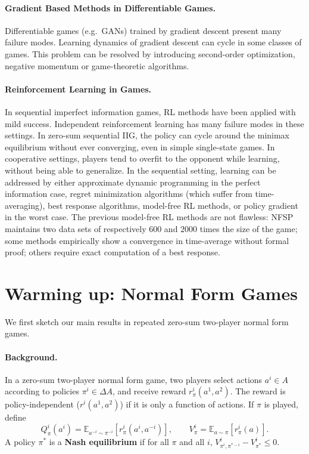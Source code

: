 \paragraph{Gradient Based Methods in Differentiable Games.}
Differentiable games (e.g.\ GANs) trained by gradient descent present many failure modes. Learning dynamics of gradient descent can cycle in some classes of games. This problem can be resolved by introducing second-order optimization, negative momentum or game-theoretic algorithms.

\paragraph{Reinforcement Learning in Games.}
In sequential imperfect information games, RL methods have been applied with mild success. Independent reinforcement learning has many failure modes in these settings. In zero-sum sequential IIG, the policy can cycle around the minimax equilibrium without ever converging, even in simple single-state games. In cooperative settings, players tend to overfit to the opponent while learning, without being able to generalize. In the sequential setting, learning can be addressed by either approximate dynamic programming in the perfect information case, regret minimization algorithms (which suffer from time-averaging), best response algorithms, model-free RL methods, or policy gradient in the worst case. The previous model-free RL methods are not flawless: NFSP maintains two data sets of respectively $600$ and $2000$ times the size of the game; some methods empirically show a convergence in time-average without formal proof; others require exact computation of a best response.

\section{Warming up: Normal Form Games}
We first sketch our main results in repeated zero-sum two-player normal form games.

\paragraph{Background.}
In a zero-sum two-player normal form game, two players select actions $a^i \in A$ according to policies $\pi^i \in \Delta A$, and receive reward $r_\pi^i(a^1, a^2)$. The reward is policy-independent ($r^i(a^1, a^2)$) if it is only a function of actions. If $\pi$ is played, define
$$Q^i_\pi(a^i) = \mathbb{E}_{a^{-i} \sim \pi^{-i}}[r_\pi^i(a^i, a^{-i})],\qquad V^i_\pi = \mathbb{E}_{a \sim \pi}[r_\pi^i(a)].$$
A policy $\pi^*$ is a \textbf{Nash equilibrium} if for all $\pi$ and all $i$, $V^i_{\pi^i, \pi^{*-i}} - V^i_{\pi^*} \leq 0$.

